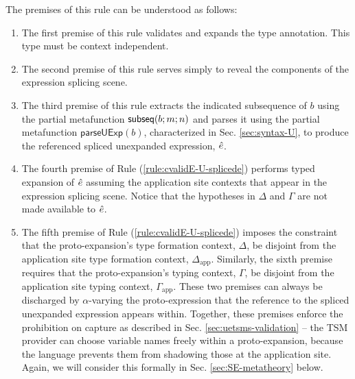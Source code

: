 The premises of this rule can be understood as follows:
\begin{enumerate}
\item The first premise of this rule validates and expands the type annotation. This type must be context independent.

\item The second premise of this rule serves simply to reveal the components of the expression splicing scene.

\item The third premise of this rule extracts the indicated subsequence of $b$ using the partial metafunction $\mathsf{subseq}(b; m; n)$ and parses it using the partial metafunction $\mathsf{parseUExp}(b)$, characterized in Sec. \ref{sec:syntax-U}, to produce the referenced spliced unexpanded expression, ${\hat e}$.

\item The fourth premise of Rule (\ref{rule:cvalidE-U-splicede}) performs typed expansion of ${\hat e}$ assuming the application site contexts that appear in the expression splicing scene. Notice that the hypotheses in $\Delta$ and $\Gamma$ are not made available to ${\hat e}$. 

\item The fifth premise of Rule (\ref{rule:cvalidE-U-splicede}) imposes the constraint that the proto-expansion's type formation context, $\Delta$, be disjoint from the application site type formation context, $\Delta_\text{app}$. Similarly, the sixth premise requires that the proto-expansion's typing context, $\Gamma$, be disjoint from the application site typing context, $\Gamma_\text{app}$. These two premises can always be discharged by $\alpha$-varying the proto-expression that the reference to the spliced unexpanded expression appears within. 
Together, these premises enforce the prohibition on capture as described in Sec. \ref{sec:uetsms-validation} -- the TSM provider can choose variable names freely within a proto-expansion, because the language prevents them from shadowing those at the application site. Again, we will consider this formally in Sec. \ref{sec:SE-metatheory} below.
\end{enumerate}
